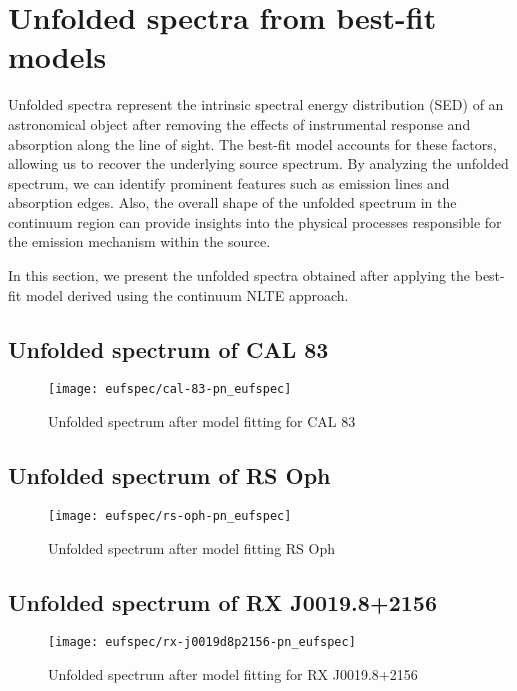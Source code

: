 	\newpage
	\section{Unfolded spectra from best-fit models}
		Unfolded spectra represent the intrinsic spectral energy distribution (SED) of an astronomical object after removing the effects of instrumental response and absorption along the line of sight. The best-fit model accounts for these factors, allowing us to recover the underlying source spectrum. By analyzing the unfolded spectrum, we can identify prominent features such as emission lines and absorption edges. Also, the overall shape of the unfolded spectrum in the continuum region can provide insights into the physical processes responsible for the emission mechanism within the source.
		
		In this section, we present the unfolded spectra obtained after applying the best-fit model derived using the continuum NLTE approach.
	
		\subsection*{Unfolded spectrum of CAL 83}
			\begin{figure}[h!]
				\centering
				\texttt{[image: eufspec/cal-83-pn\_eufspec]}
				\caption{Unfolded spectrum after model fitting for CAL 83}
				\label{result:euf-cal-83}
			\end{figure}
		
		\subsection*{Unfolded spectrum of RS Oph}
			\begin{figure}[h!]
				\centering
				\texttt{[image: eufspec/rs-oph-pn\_eufspec]}
				\caption{Unfolded spectrum after model fitting RS Oph}
				\label{result:euf-rs-oph}
			\end{figure}
		
		\subsection*{Unfolded spectrum of RX J0019.8+2156}
			\begin{figure}[h!]
				\centering
				\texttt{[image: eufspec/rx-j0019d8p2156-pn\_eufspec]}
				\caption{Unfolded spectrum after model fitting for RX J0019.8+2156}
				\label{result:euf-rx-j0019}
			\end{figure}
		
